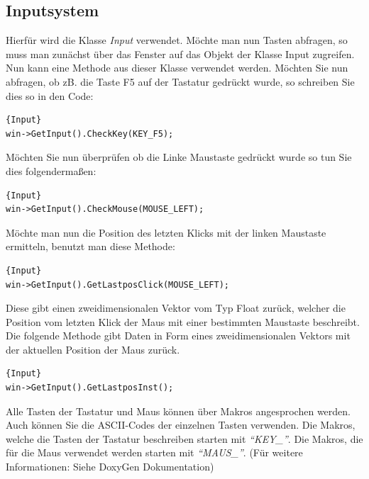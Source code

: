 \subsection{Inputsystem}
\label{inputsystemver}
Hierfür wird die Klasse \textit{Input} verwendet. Möchte man nun Tasten abfragen, so muss man zunächst über das Fenster auf das Objekt der Klasse Input zugreifen. 
Nun kann eine Methode aus dieser Klasse verwendet werden.
Möchten Sie nun abfragen, ob zB. die Taste F5 auf der Tastatur gedrückt wurde, so schreiben Sie dies so in den Code:
\begin{lstlisting}{Input}
win->GetInput().CheckKey(KEY_F5);
\end{lstlisting}
Möchten Sie nun überprüfen ob die Linke Maustaste gedrückt wurde so tun Sie dies folgendermaßen:
\begin{lstlisting}{Input}
win->GetInput().CheckMouse(MOUSE_LEFT);
\end{lstlisting}

Möchte man nun die Position des letzten Klicks mit der linken Maustaste ermitteln, benutzt man diese Methode:
\begin{lstlisting}{Input}
win->GetInput().GetLastposClick(MOUSE_LEFT);
\end{lstlisting}
Diese gibt einen zweidimensionalen Vektor vom Typ Float zurück, welcher die Position vom letzten Klick der Maus mit einer bestimmten Maustaste beschreibt. 
Die folgende Methode gibt Daten in Form eines zweidimensionalen Vektors mit der aktuellen Position der Maus zurück.
\begin{lstlisting}{Input}
win->GetInput().GetLastposInst();
\end{lstlisting}

Alle Tasten der Tastatur und Maus können über Makros angesprochen werden. Auch können Sie die ASCII-Codes der einzelnen Tasten verwenden. Die Makros, welche die Tasten der Tastatur beschreiben starten mit \textit{"`KEY\_"'}. Die Makros, die für die Maus verwendet werden starten mit \textit{"`MAUS\_"'}.
(Für weitere Informationen: Siehe DoxyGen Dokumentation)